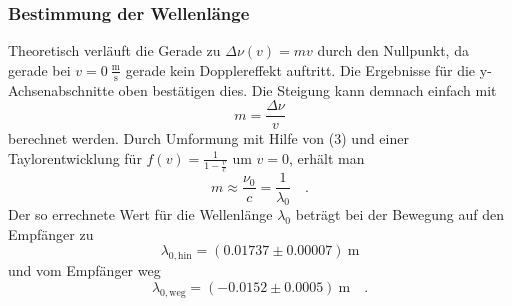 \subsubsection{Bestimmung der Wellenlänge}
Theoretisch verläuft die Gerade zu $ \Delta\nu(v)=m v $ durch den Nullpunkt, da gerade bei $v=0\ \frac{\text{m}}{\text{s}}$ gerade kein Dopplereffekt auftritt. Die Ergebnisse für die y-Achsenabschnitte oben bestätigen dies. Die Steigung kann demnach einfach mit
\begin{equation}
	m = \frac{\Delta\nu}{v}
\end{equation}
berechnet werden. Durch Umformung mit Hilfe von (3) und einer Taylorentwicklung für $f(v) = \frac{1}{1-\frac{v}{c}}$ um $v=0$, erhält man
\begin{equation}
	m \approx \frac{\nu_0}{c} = \frac{1}{\lambda_0} \quad .
\end{equation}
Der so errechnete Wert für die Wellenlänge $\lambda_0$ beträgt bei der Bewegung auf den Empfänger zu
\begin{equation}
	\lambda_{0, \text{hin}} = (0.01737 \pm 0.00007)\ \text{m}
\end{equation}
und vom Empfänger weg
\begin{equation}
	\lambda_{0, \text{weg}} = (-0.0152 \pm 0.0005)\ \text{m} \quad .
\end{equation}

